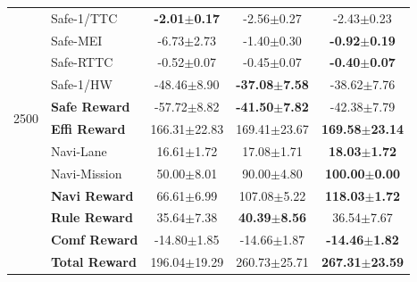 {\begin{longtable}{l l c c c}
  \multirow{10}{*}{2500}
  & Safe-1/TTC       & \textbf{-2.01$\pm$0.17} & -2.56$\pm$0.27 & -2.43$\pm$0.23 \\
  & Safe-MEI         & -6.73$\pm$2.73 & -1.40$\pm$0.30 & \textbf{-0.92$\pm$0.19} \\
  & Safe-RTTC        & -0.52$\pm$0.07 & -0.45$\pm$0.07 & \textbf{-0.40$\pm$0.07} \\
  & Safe-1/HW        & -48.46$\pm$8.90 & \textbf{-37.08$\pm$7.58} & -38.62$\pm$7.76 \\
  & \textbf{Safe Reward} & -57.72$\pm$8.82 & \textbf{-41.50$\pm$7.82} & -42.38$\pm$7.79 \\
  & \textbf{Effi Reward} & 166.31$\pm$22.83 & 169.41$\pm$23.67 & \textbf{169.58$\pm$23.14} \\
  & Navi-Lane        & 16.61$\pm$1.72 & 17.08$\pm$1.71 & \textbf{18.03$\pm$1.72} \\
  & Navi-Mission     & 50.00$\pm$8.01 & 90.00$\pm$4.80 & \textbf{100.00$\pm$0.00} \\
  & \textbf{Navi Reward} & 66.61$\pm$6.99 & 107.08$\pm$5.22 & \textbf{118.03$\pm$1.72} \\
  & \textbf{Rule Reward} & 35.64$\pm$7.38 & \textbf{40.39$\pm$8.56} & 36.54$\pm$7.67 \\
  & \textbf{Comf Reward} & -14.80$\pm$1.85 & -14.66$\pm$1.87 & \textbf{-14.46$\pm$1.82} \\
  & \textbf{Total Reward} & 196.04$\pm$19.29 & 260.73$\pm$25.71 & \textbf{267.31$\pm$23.59} \\
  \midrule


\end{longtable}}
